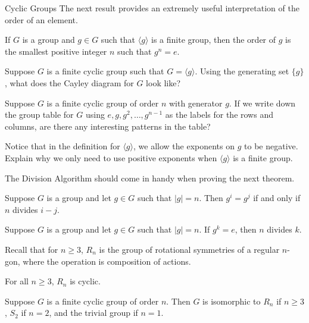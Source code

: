 \begin{section}{Cyclic Groups}
The next result provides an extremely useful interpretation of the order of an element.

\begin{corollary}\label{cor:order_smallest_exponent}
If $G$ is a group and $g\in G$ such that $\langle g\rangle$ is a finite group, then the order of $g$ is the smallest positive integer $n$ such that $g^n=e$.
\end{corollary}

\begin{problem}\label{prob:Cayley_cyclic}
Suppose $G$ is a finite cyclic group such that $G=\langle g\rangle$. Using the generating set $\{g\}$, what does the Cayley diagram for $G$ look like?
\end{problem}

\begin{problem}
Suppose $G$ is a finite cyclic group of order $n$ with generator $g$.  If we write down the group table for $G$ using $e, g, g^2, \ldots, g^{n-1}$ as the labels for the rows and columns, are there any interesting patterns in the table?
\end{problem}

\begin{problem}\label{prob:finite_pos_exps}
Notice that in the definition for $\langle g\rangle$, we allow the exponents on $g$ to be negative.  Explain why we only need to use positive exponents when $\langle g\rangle$ is a finite group.
\end{problem}

The Division Algorithm should come in handy when proving the next theorem.

\begin{theorem}\label{thm:criterion_on_powers}
Suppose $G$ is a group and let $g\in G$ such that $|g|=n$.  Then $g^i=g^j$ if and only if $n$ divides $i-j$.
\end{theorem}

\begin{corollary}
Suppose $G$ is a group and let $g\in G$ such that $|g|=n$.  If $g^k=e$, then $n$ divides $k$.
\end{corollary}

Recall that for $n\geq3$, $R_n$ is the group of rotational symmetries of a regular $n$-gon, where the operation is composition of actions.

\begin{theorem}
For all $n\geq 3$, $R_n$ is cyclic.
\end{theorem}

\begin{theorem}\label{thm:finite_cyclic_groups}
Suppose $G$ is a finite cyclic group of order $n$.  Then $G$ is isomorphic to $R_n$ if $n\geq 3$, $S_2$ if $n=2$, and the trivial group if $n=1$.
\end{theorem}


\end{section}
